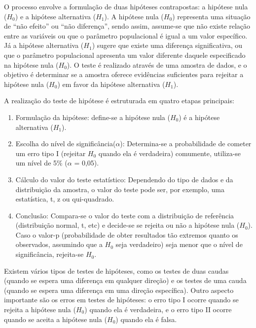 O processo envolve a formulação de duas hipóteses contrapostas: a hipótese nula (\( H_0 \)) e a hipótese alternativa (\( H_1 \)). A hipótese nula (\( H_0 \)) representa uma situação de “não efeito” ou “não diferença”, sendo assim, assume-se que não existe relação entre as variáveis ou que o parâmetro populacional é igual a um valor específico. Já a hipótese alternativa (\( H_1 \)) sugere que existe uma diferença significativa, ou que o parâmetro populacional apresenta um valor diferente daquele especificado na hipótese nula (\( H_0 \)). O teste é realizado através de uma amostra de dados, e o objetivo é determinar se a amostra oferece evidências suficientes para rejeitar a hipótese nula (\( H_0 \)) em favor da hipótese alternativa (\( H_1 \)). 

A realização do teste de hipótese é estruturada em quatro etapas principais: 
\begin{enumerate}
    



\item Formulação da hipótese: define-se a hipótese nula (\( H_0 \)) é a hipótese alternativa (\( H_1 \)). 

\item  Escolha do nível de significância(\(\alpha\)): Determina-se a probabilidade de cometer um erro tipo I (rejeitar  \( H_0 \) quando ela é verdadeira) comumente, utiliza-se um nível de 5\% (\(\alpha\) = 0,05).

\item Cálculo do valor do teste estatístico: Dependendo do tipo de dados e da distribuição da amostra, o valor do teste pode ser, por exemplo, uma estatística, t, z ou qui-quadrado. 
\item Conclusão: Compara-se o valor do teste com a distribuição de referência (distribuição normal, t, etc) e decide-se se rejeita ou não a hipótese nula (\( H_0 \)). Caso o valor-p (probabilidade de obter resultados tão extremos quanto os observados, assumindo que a \( H_0 \) seja verdadeiro) seja menor que o nível de significância, rejeita-se \( H_0 \). 
\end{enumerate}
Existem vários tipos de testes de hipóteses, como os testes de duas caudas (quando se espera uma diferença em qualquer direção) e os testes de uma cauda (quando se espera uma diferença em uma direção específica). Outro aspecto importante são os erros em testes de hipóteses: o erro tipo I ocorre quando se rejeita a hipótese nula (\( H_0 \)) quando ela é verdadeira, e o erro tipo II ocorre quando se aceita a hipótese nula (\( H_0 \)) quando ela é falsa. 


